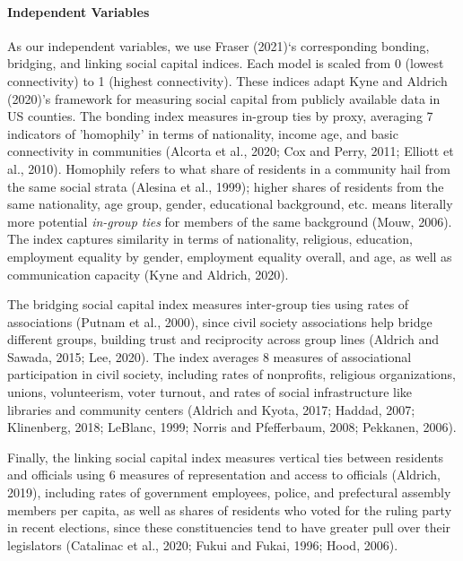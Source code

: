 \documentclass[]{elsarticle} %
\begin{document}
\hypertarget{independent-variables}{%
\paragraph{Independent Variables}\label{independent-variables}}

As our independent variables, we use Fraser (2021)`s corresponding
bonding, bridging, and linking social capital indices. Each model is
scaled from 0 (lowest connectivity) to 1 (highest connectivity). These
indices adapt Kyne and Aldrich (2020)'s framework for measuring social
capital from publicly available data in US counties. The bonding index
measures in-group ties by proxy, averaging 7 indicators of 'homophily'
in terms of nationality, income age, and basic connectivity in
communities (Alcorta et al., 2020; Cox and Perry, 2011; Elliott et al.,
2010). Homophily refers to what share of residents in a community hail
from the same social strata (Alesina et al., 1999); higher shares of
residents from the same nationality, age group, gender, educational
background, etc. means literally more potential \emph{in-group ties} for
members of the same background (Mouw, 2006). The index captures
similarity in terms of nationality, religious, education, employment
equality by gender, employment equality overall, and age, as well as
communication capacity (Kyne and Aldrich, 2020).

The bridging social capital index measures inter-group ties using rates
of associations (Putnam et al., 2000), since civil society associations
help bridge different groups, building trust and reciprocity across
group lines (Aldrich and Sawada, 2015; Lee, 2020). The index averages 8
measures of associational participation in civil society, including
rates of nonprofits, religious organizations, unions, volunteerism,
voter turnout, and rates of social infrastructure like libraries and
community centers (Aldrich and Kyota, 2017; Haddad, 2007; Klinenberg,
2018; LeBlanc, 1999; Norris and Pfefferbaum, 2008; Pekkanen, 2006).

Finally, the linking social capital index measures vertical ties between
residents and officials using 6 measures of representation and access to
officials (Aldrich, 2019), including rates of government employees,
police, and prefectural assembly members per capita, as well as shares
of residents who voted for the ruling party in recent elections, since
these constituencies tend to have greater pull over their legislators
(Catalinac et al., 2020; Fukui and Fukai, 1996; Hood, 2006).
\end{document}

